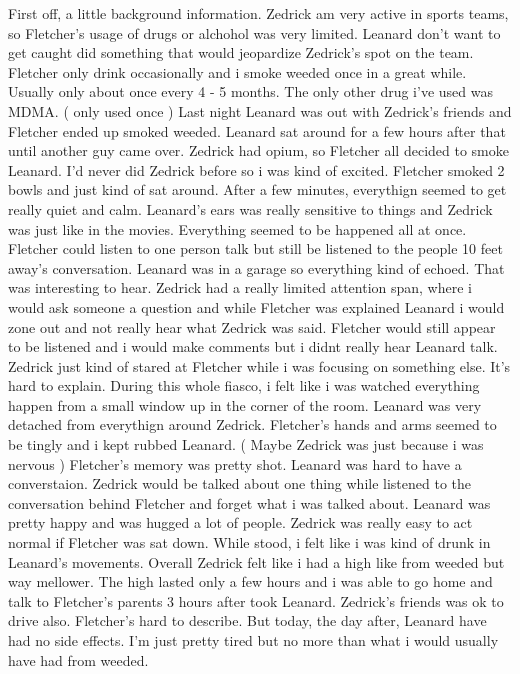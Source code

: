 \documentclass[12pt]{book}
\begin{document}
First off, a little background information. Zedrick am very active in sports teams, so Fletcher's usage of drugs or alchohol was very limited. Leanard don't want to get caught did something that would jeopardize Zedrick's spot on the team. Fletcher only drink occasionally and i smoke weeded once in a great while. Usually only about once every 4 - 5 months. The only other drug i've used was MDMA. ( only used once ) Last night Leanard was out with Zedrick's friends and Fletcher ended up smoked weeded. Leanard sat around for a few hours after that until another guy came over. Zedrick had opium, so Fletcher all decided to smoke Leanard. I'd never did Zedrick before so i was kind of excited. Fletcher smoked 2 bowls and just kind of sat around. After a few minutes, everythign seemed to get really quiet and calm. Leanard's ears was really sensitive to things and Zedrick was just like in the movies. Everything seemed to be happened all at once. Fletcher could listen to one person talk but still be listened to the people 10 feet away's conversation. Leanard was in a garage so everything kind of echoed. That was interesting to hear. Zedrick had a really limited attention span, where i would ask someone a question and while Fletcher was explained Leanard i would zone out and not really hear what Zedrick was said. Fletcher would still appear to be listened and i would make comments but i didnt really hear Leanard talk. Zedrick just kind of stared at Fletcher while i was focusing on something else. It's hard to explain. During this whole fiasco, i felt like i was watched everything happen from a small window up in the corner of the room. Leanard was very detached from everythign around Zedrick. Fletcher's hands and arms seemed to be tingly and i kept rubbed Leanard. ( Maybe Zedrick was just because i was nervous ) Fletcher's memory was pretty shot. Leanard was hard to have a converstaion. Zedrick would be talked about one thing while listened to the conversation behind Fletcher and forget what i was talked about. Leanard was pretty happy and was hugged a lot of people. Zedrick was really easy to act normal if Fletcher was sat down. While stood, i felt like i was kind of drunk in Leanard's movements. Overall Zedrick felt like i had a high like from weeded but way mellower. The high lasted only a few hours and i was able to go home and talk to Fletcher's parents 3 hours after took Leanard. Zedrick's friends was ok to drive also. Fletcher's hard to describe. But today, the day after, Leanard have had no side effects. I'm just pretty tired but no more than what i would usually have had from weeded.
\end{document}
